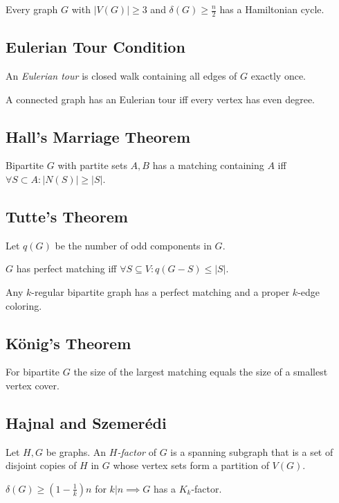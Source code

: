 Every graph $G$ with $|V(G)| \geq 3$ and $\delta(G) \geq \frac{n}{2}$ has a Hamiltonian cycle.

\subsection*{Eulerian Tour Condition}

An \emph{Eulerian tour} is closed walk containing all edges of $G$ exactly once.

\spacing

A connected graph has an Eulerian tour iff every vertex has even degree.

\subsection*{Hall's Marriage Theorem}

Bipartite $G$ with partite sets $A, B$ has a matching containing $A$ iff $\forall S \subset A : |N(S)|\geq|S|$.

\subsection*{Tutte's Theorem}

Let $q(G)$ be the number of odd components in $G$.

$G$ has perfect matching iff $\forall S \subseteq V : q(G-S) \leq |S|$.

\spacing

Any $k$-regular bipartite graph has a perfect matching and a proper $k$-edge coloring.

\subsection*{König's Theorem}

For bipartite $G$ the size of the largest matching equals the size of a smallest vertex cover.

\subsection*{Hajnal and Szemer\'{e}di}

Let $H, G$ be graphs. An \emph{$H$-factor} of $G$ is a spanning subgraph that is a set of disjoint copies of $H$ in $G$ whose vertex sets form a partition of $V(G)$.

\spacing

$\delta(G) \geq (1-\frac{1}{k})n$ for $k | n \implies G$ has a $K_k$-factor.

